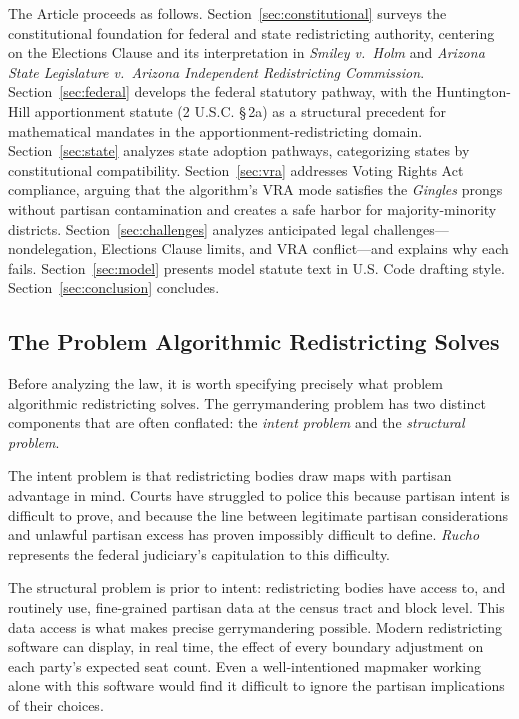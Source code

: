 The Article proceeds as follows. Section~\ref{sec:constitutional} surveys the constitutional foundation for federal and state redistricting authority, centering on the Elections Clause and its interpretation in \textit{Smiley v.\ Holm} and \textit{Arizona State Legislature v.\ Arizona Independent Redistricting Commission}. Section~\ref{sec:federal} develops the federal statutory pathway, with the Huntington-Hill apportionment statute (2 U.S.C. \S\,2a) as a structural precedent for mathematical mandates in the apportionment-redistricting domain. Section~\ref{sec:state} analyzes state adoption pathways, categorizing states by constitutional compatibility. Section~\ref{sec:vra} addresses Voting Rights Act compliance, arguing that the algorithm's VRA mode satisfies the \textit{Gingles} prongs without partisan contamination and creates a safe harbor for majority-minority districts. Section~\ref{sec:challenges} analyzes anticipated legal challenges---nondelegation, Elections Clause limits, and VRA conflict---and explains why each fails. Section~\ref{sec:model} presents model statute text in U.S. Code drafting style. Section~\ref{sec:conclusion} concludes.

\subsection{The Problem Algorithmic Redistricting Solves}

Before analyzing the law, it is worth specifying precisely what problem algorithmic redistricting solves. The gerrymandering problem has two distinct components that are often conflated: the \textit{intent problem} and the \textit{structural problem}.

The intent problem is that redistricting bodies draw maps with partisan advantage in mind. Courts have struggled to police this because partisan intent is difficult to prove, and because the line between legitimate partisan considerations and unlawful partisan excess has proven impossibly difficult to define. \textit{Rucho} represents the federal judiciary's capitulation to this difficulty.

The structural problem is prior to intent: redistricting bodies have access to, and routinely use, fine-grained partisan data at the census tract and block level. This data access is what makes precise gerrymandering possible. Modern redistricting software can display, in real time, the effect of every boundary adjustment on each party's expected seat count. Even a well-intentioned mapmaker working alone with this software would find it difficult to ignore the partisan implications of their choices.

